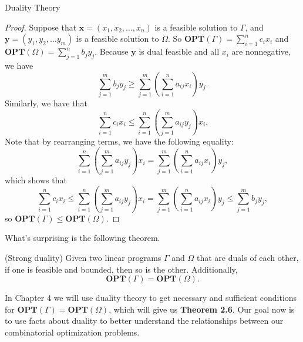 \begin{section}{Duality Theory}
	\begin{proof}
		Suppose that $\mathbf{x} = (x_1, x_2,\dots,x_n)$ is a feasible solution to $\Gamma$, and 
		$\mathbf{y} = (y_1, y_2, \dots y_m)$ is a feasible solution to $\Omega$. 
		So $\mathbf{OPT}(\Gamma) = \sum_{i=1}^{n} c_i x_i$ and 
		$\mathbf{OPT}(\Omega) = \sum_{j=1}^{n} b_j y_j$.
		Because 
		$\mathbf{y}$ is dual feasible and all $x_i$ are nonnegative, we have 
		\[
			\sum_{j=1}^{m} b_j y_j \geq \sum_{j=1}^{m}\left(\sum_{i=1}^{n} a_{ij}x_i\right) 
			y_j.
		\]
		Similarly, we have that 
		\[
			\sum_{i=1}^{n} c_i x_i \leq \sum_{i=1}^{n}\left(\sum_{j=1}^{m} a_{ij} y_j\right) 
			x_i.
		\]
		Note that by rearranging terms, we have the following equality:
		\[
			\sum_{i=1}^{n}\left(\sum_{j=1}^{m} a_{ij} y_j\right) 
			x_i =
			\sum_{j=1}^{m}\left(\sum_{i=1}^{n} a_{ij}x_i\right) 
			y_j,
		\]
		which shows that 
		\[
			\sum_{i=1}^{n} c_i x_i \leq 
			\sum_{i=1}^{n}\left(\sum_{j=1}^{m} a_{ij} y_j\right) 
			x_i =
			\sum_{j=1}^{m}\left(\sum_{i=1}^{n} a_{ij}x_i\right) 
			y_j \leq 
			\sum_{j=1}^{m} b_j y_j,
		\]
		so $\mathbf{OPT}(\Gamma) \leq \mathbf{OPT}(\Omega)$.
	\end{proof}
	What's surprising is the following theorem.

	\begin{theorem}{(Strong duality)}
		Given two linear programs $\Gamma$ and $\Omega$ that are duals of each other, if one is 
		feasible and bounded, then so is the other. Additionally, 
		\[
			\mathbf{OPT}(\Gamma) = \mathbf{OPT}(\Omega).
		\]
	\end{theorem} 
	In Chapter 4 we will use duality theory to get necessary and sufficient conditions for 
	$\mathbf{OPT}(\Gamma) = \mathbf{OPT}(\Omega)$, which will give us \textbf{Theorem 2.6}.
	Our goal now is to use facts about duality to better understand the relationships between 
	our combinatorial optimization problems.


\end{section}
